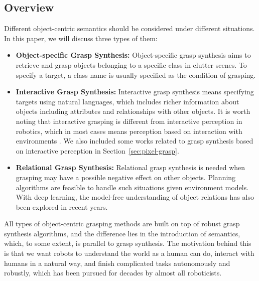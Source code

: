 \documentclass[letterpaper,10pt]{article}
\newcommand{\secref}[1]{Section~\ref{#1}}
\begin{document}
\subsection{Overview}

Different object-centric semantics should be considered under different situations.
In this paper, we will discuss three types of them:
\begin{itemize}
	\item {\bf Object-specific Grasp Synthesis:} Object-specific grasp synthesis aims to retrieve and grasp objects belonging to a specific class in clutter scenes. To specify a target, a class name is usually specified as the condition of grasping.
	\item {\bf Interactive Grasp Synthesis:} Interactive grasp synthesis means specifying targets using natural languages, which includes richer information about objects including attributes and relationships with other objects. It is worth noting that interactive grasping is different from interactive perception in robotics, which in most cases means perception based on interaction with environments \cite{bohg2017interactive}. We also included some works related to grasp synthesis based on interactive perception in \secref{sec:pixel-grasp}.
	\item {\bf Relational Grasp Synthesis:} Relational grasp synthesis is needed when grasping may have a possible negative effect on other objects. Planning algorithms \cite{lavalle2006planning} are feasible to handle such situations given environment models. With deep learning, the model-free understanding of object relations has also been explored in recent years. 
\end{itemize}
All types of object-centric grasping methods are built on top of robust grasp synthesis algorithms, and the difference lies in the introduction of semantics, which, to some extent, is parallel to grasp synthesis.
The motivation behind this is that we want robots to understand the world as a human can do, interact with humans in a natural way, and finish complicated tasks autonomously and robustly, which has been pursued for decades by almost all roboticists.
\end{document}
